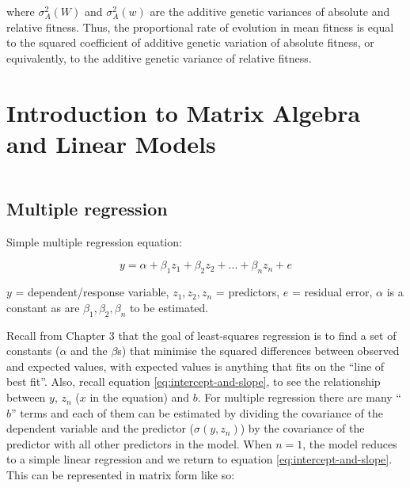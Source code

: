 \documentclass[
]{book}
\begin{document}
where \(\sigma^2_A(W)\) and \(\sigma^2_A(w)\) are the additive genetic variances of absolute and relative fitness. Thus, the proportional rate of evolution in mean fitness is equal to the squared coefficient of additive genetic variation of absolute fitness, or equivalently, to the additive genetic variance of relative fitness.

\hypertarget{introduction-to-matrix-algebra-and-linear-models}{%
\chapter{Introduction to Matrix Algebra and Linear Models}\label{introduction-to-matrix-algebra-and-linear-models}}

\[\newcommand{\mx}[1]{\mathbf{#1}}\]

\hypertarget{multiple-regression}{%
\section{Multiple regression}\label{multiple-regression}}

Simple multiple regression equation:

\begin{equation}
    y = \alpha + \beta_1z_1 + \beta_2z_2 + ... + \beta_nz_n + e
    \label{eq:simple-multiple-regression}
\end{equation}

\(y\) = dependent/response variable, \(z_1, z_2, z_n\) = predictors, \(e\) = residual error, \(\alpha\) is a constant as are \(\beta_1, \beta_2, \beta_n\) to be estimated.

Recall from Chapter 3 that the goal of least-squares regression is to find a set of constants (\(\alpha\) and the \(\beta\)s) that minimise the squared differences between observed and expected values, with expected values is anything that fits on the ``line of best fit''. Also, recall equation \eqref{eq:intercept-and-slope}, to see the relationship between \(y\), \(z_n\) (\(x\) in the equation) and \(b\). For multiple regression there are many ``\(b\)'' terms and each of them can be estimated by dividing the covariance of the dependent variable and the predictor (\(\sigma(y, z_n)\)) by the covariance of the predictor with all other predictors in the model. When \(n = 1\), the model reduces to a simple linear regression and we return to equation \eqref{eq:intercept-and-slope}. This can be represented in matrix form like so:
\end{document}
